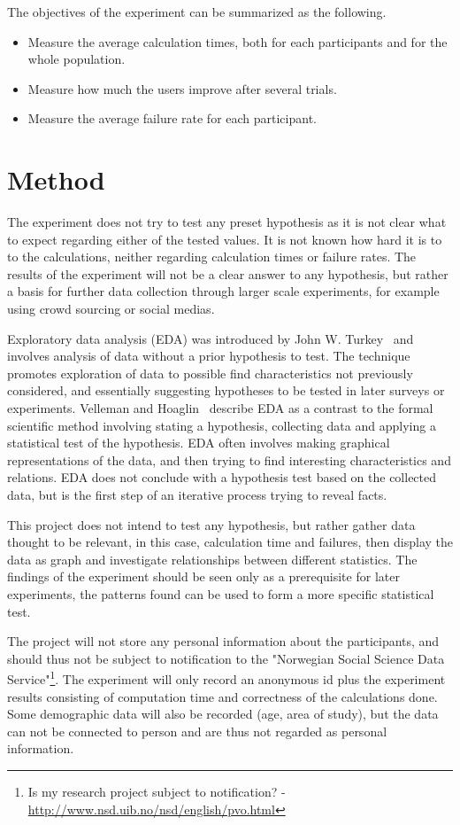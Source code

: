 \par The objectives of the experiment can be summarized as the following.
\begin{itemize}
    \item Measure the average calculation times, both for each participants and for the whole population.
    \item Measure how much the users improve after several trials.
    \item Measure the average failure rate for each participant.
\end{itemize}


\section{Method}
The experiment does not try to test any preset hypothesis as it is not clear what to expect regarding either of the tested values. It is not known how hard it is to to the calculations, neither regarding calculation times or failure rates. The results of the experiment will not be a clear answer to any hypothesis, but rather a basis for further data collection through larger scale experiments, for example using crowd sourcing or social medias.

\par Exploratory data analysis (EDA) was introduced by John W. Turkey~\cite{turkey} and involves analysis of data without a prior hypothesis to test. The technique promotes exploration of data to possible find characteristics not previously considered, and essentially suggesting hypotheses to be tested in later surveys or experiments. Velleman and Hoaglin~\cite{exploratory-analysis} describe EDA as a contrast to the formal scientific method involving stating a hypothesis, collecting data and applying a statistical test of the hypothesis. EDA often involves making graphical representations of the data, and then trying to find interesting characteristics and relations. EDA does not conclude with a hypothesis test based on the collected data, but is the first step of an iterative process trying to reveal facts. 
\par This project does not intend to test any hypothesis, but rather gather data thought to be relevant, in this case, calculation time and failures, then display the data as graph and investigate relationships between different statistics. The findings of the experiment should be seen only as a prerequisite for later experiments, the patterns found can be used to form a more specific statistical test.
\begin{remark}
 The project will not store any personal information about the participants, and should thus not be subject to notification to the "Norwegian Social Science Data Service"\footnote{Is my research project subject to notification? - \url{http://www.nsd.uib.no/nsd/english/pvo.html}}. The experiment will only record an anonymous id plus the experiment results consisting of computation time and correctness of the calculations done. Some demographic data will also be recorded (age, area of study), but the data can not be connected to person and are thus not regarded as personal information.
 \end{remark}

